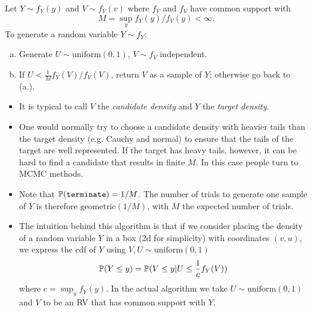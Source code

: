 \begin{definition}
    Let $Y \sim f_Y(y)$ and $V \sim f_V(v)$ where $f_Y$ and $f_V$ have common support with
    \[
        M = \sup_y f_Y(y) / f_V(y) < \infty.
    \]
    To generate a random variable $Y \sim f_Y$:
    \begin{enumerate}[a.]
        \item Generate $U \sim \text{uniform}(0, 1)$, $V \sim f_V$ independent.
        \item If $U < \frac 1M f_Y(V)/f_V(V)$, return $V$ as a sample of $Y$; otherwise go back to (a.).
    \end{enumerate}
\end{definition}

\begin{remark}
    \mbox{}
    \begin{itemize}
        \item It is typical to call $V$ the \emph{candidate density} and $Y$ the \emph{target density}.
        \item One would normally try to choose a candidate density with heavier tails than the target density (e.g. Cauchy and normal) to ensure that the tails of the target are well represented. If the target has heavy tails, however, it can be hard to find a candidate that results in finite $M$. In this case people turn to MCMC methods.
        \item Note that $\P{}(\texttt{terminate}) = 1/M$. The number of trials to generate one sample of $Y$ is therefore $\text{geometric}(1/M)$, with $M$ the expected number of trials.
        \item The intuition behind this algorithm is that if we consider placing the density of a random variable $Y$ in a box (2d for simplicity) with coordinates $(v,u)$, we express the cdf of $Y$ using $V, U \sim \text{uniform}(0, 1)$
        \[
            \P{}(Y \leq y) = \P{}(V \leq y \vert{} U \leq \frac1c f_Y(V))
        \]
        where $c = \sup_y f_Y(y)$. In the actual algorithm we take $U \sim \text{uniform}(0,1)$ and $V$ to be an RV that has common support with $Y$.
    \end{itemize}
\end{remark}


